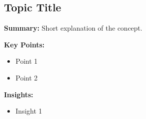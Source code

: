 \subsection{Topic Title}

\textbf{Summary:}  
Short explanation of the concept.

\textbf{Key Points:}
\begin{itemize}
    \item Point 1
    \item Point 2
\end{itemize}

\textbf{Insights:}
\begin{itemize}
    \item Insight 1
\end{itemize}